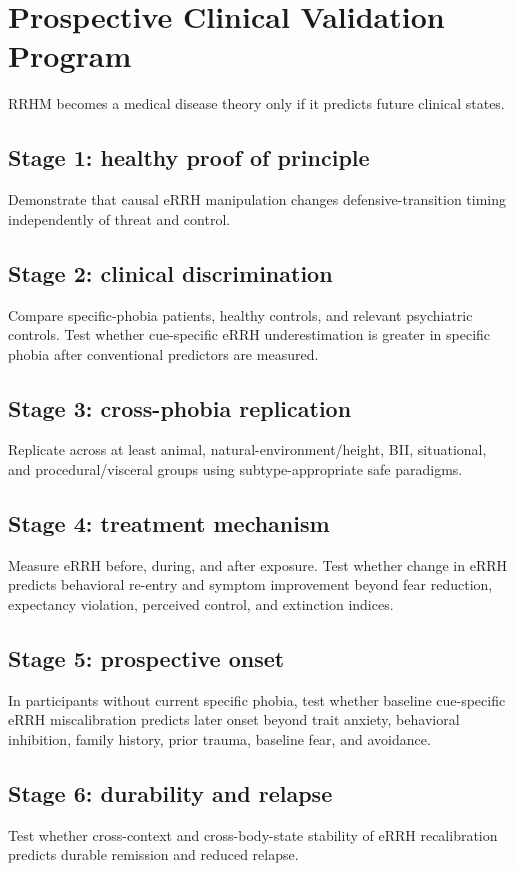 \documentclass[9pt,twocolumn]{article}
\begin{document}
\section{Prospective Clinical Validation Program}
RRHM becomes a medical disease theory only if it predicts future clinical states.

\subsection{Stage 1: healthy proof of principle}
Demonstrate that causal eRRH manipulation changes defensive-transition timing independently of threat and control.

\subsection{Stage 2: clinical discrimination}
Compare specific-phobia patients, healthy controls, and relevant psychiatric controls. Test whether cue-specific eRRH underestimation is greater in specific phobia after conventional predictors are measured.

\subsection{Stage 3: cross-phobia replication}
Replicate across at least animal, natural-environment/height, BII, situational, and procedural/visceral groups using subtype-appropriate safe paradigms.

\subsection{Stage 4: treatment mechanism}
Measure eRRH before, during, and after exposure. Test whether change in eRRH predicts behavioral re-entry and symptom improvement beyond fear reduction, expectancy violation, perceived control, and extinction indices.

\subsection{Stage 5: prospective onset}
In participants without current specific phobia, test whether baseline cue-specific eRRH miscalibration predicts later onset beyond trait anxiety, behavioral inhibition, family history, prior trauma, baseline fear, and avoidance.

\subsection{Stage 6: durability and relapse}
Test whether cross-context and cross-body-state stability of eRRH recalibration predicts durable remission and reduced relapse.
\end{document}
